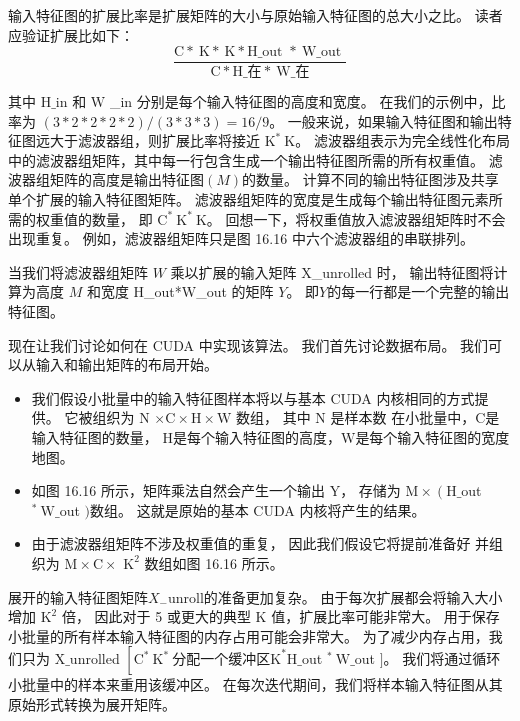 输入特征图的扩展比率是扩展矩阵的大小与原始输入特征图的总大小之比。 读者应验证扩展比如下：
$$
\frac{\mathrm{C} * \mathrm{~K} * \mathrm{~K} * \mathrm{H} \_ \text {out } * \mathrm{~W} \_ \text {out }} {\mathrm{C} * \mathrm{H} \_ \text {在} * \mathrm{~W} \_ \text {在}}
$$

其中 $\mathrm{H} \_$in 和 $\mathrm{W}$ \_in 分别是每个输入特征图的高度和宽度。 
在我们的示例中，比率为 $(3 * 2 * 2 * 2 * 2) /(3 * 3 * 3)=16 / 9$。 
一般来说，如果输入特征图和输出特征图远大于滤波器组，则扩展比率将接近 $\mathrm{K}^{*} \mathrm{~K}$。 
滤波器组表示为完全线性化布局中的滤波器组矩阵，其中每一行包含生成一个输出特征图所需的所有权重值。 
滤波器组矩阵的高度是输出特征图$(M)$的数量。 计算不同的输出特征图涉及共享单个扩展的输入特征图矩阵。 
滤波器组矩阵的宽度是生成每个输出特征图元素所需的权重值的数量，
即 $\mathrm{C}^{*} \mathrm{~K}^{*} \mathrm{~ K}$。 回想一下，将权重值放入滤波器组矩阵时不会出现重复。 
例如，滤波器组矩阵只是图 16.16 中六个滤波器组的串联排列。

当我们将滤波器组矩阵 $W$ 乘以扩展的输入矩阵 X\_unrolled 时，
输出特征图将计算为高度 $M$ 和宽度 H\_out*W\_out 的矩阵 $Y$。 即$Y$的每一行都是一个完整的输出特征图。

现在让我们讨论如何在 CUDA 中实现该算法。 我们首先讨论数据布局。 
我们可以从输入和输出矩阵的布局开始。
\begin{itemize}
   \item 我们假设小批量中的输入特征图样本将以与基本 CUDA 内核相同的方式提供。 
   	它被组织为 $\mathrm{N}$ $\times \mathrm{C} \times \mathrm{H} \times \mathrm{W}$ 数组，
   	其中 $\mathrm{N}$ 是样本数 在小批量中，$\mathrm{C}$是输入特征图的数量，
   	$\mathrm{H}$是每个输入特征图的高度，$\mathrm{W}$是每个输入特征图的宽度 地图。

   \item 如图 16.16 所示，矩阵乘法自然会产生一个输出 Y，
   	存储为 $\mathrm{M} \times\left(\mathrm{H} \_\right.$out ${ }^{ *} \mathrm{~W} \_$out $)$数组。 
   	这就是原始的基本 CUDA 内核将产生的结果。

   \item 由于滤波器组矩阵不涉及权重值的重复，
   	因此我们假设它将提前准备好
   	并组织为 $\mathrm{M} \times \mathrm{C} \times$ $\mathrm{K }^{2}$ 数组如图 16.16 所示。
\end{itemize}

展开的输入特征图矩阵$X_{-}$unroll的准备更加复杂。 由于每次扩展都会将输入大小增加 $\mathrm{K}^{2}$ 倍，
因此对于 5 或更大的典型 $\mathrm{K}$ 值，扩展比率可能非常大。 用于保存小批量的所有样本输入特征图的内存占用可能会非常大。 
为了减少内存占用，我们只为 $\mathrm{X} \_$unrolled $\left[\mathrm{C}^{*} \mathrm{~K}^{*} \mathrm{~ 分配一个缓冲区 K}^{*} \mathrm{H} \_\right.$out ${ }^{*} \mathrm{~W} \_$out $]$。 
我们将通过循环小批量中的样本来重用该缓冲区。 在每次迭代期间，我们将样本输入特征图从其原始形式转换为展开矩阵。

